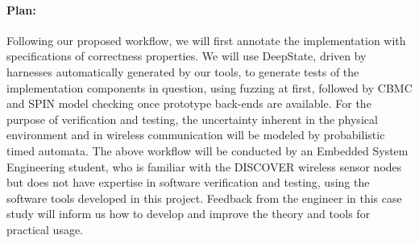 \paragraph{Plan:}
Following our proposed workflow, we will first annotate the implementation with specifications of correctness properties.
We will use DeepState, driven by harnesses automatically generated by our tools, to generate tests of the implementation components in question, using fuzzing at first, followed by CBMC and SPIN model checking once prototype back-ends are available.
For the purpose of verification and testing, the uncertainty inherent in the physical environment and in wireless communication will be modeled by probabilistic timed automata.
%
%
The above workflow will be conducted by an Embedded System Engineering student, who is familiar with the DISCOVER wireless sensor nodes but does not have expertise in software verification and testing, using the software tools developed in this project.
Feedback from the engineer in this case study will inform us how to develop and improve the theory and tools for practical usage.


